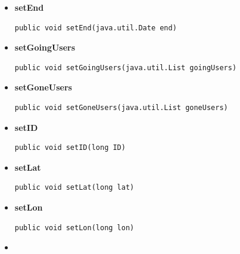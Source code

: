 \documentclass[11pt,a4paper]{article}
\begin{document}
{{{{\begin{itemize}
{\begin{lstlisting}[frame=none]
public void setDescription(java.lang.String description)\end{lstlisting} %
}%
\item{ 
\hypertarget{edu.kit.pse17.go_app.PersistenceLayer.GoEntity.setEnd(java.util.Date)}{{\bf  setEnd}\\}
\begin{lstlisting}[frame=none]
public void setEnd(java.util.Date end)\end{lstlisting} %
}%
\item{ 
\hypertarget{edu.kit.pse17.go_app.PersistenceLayer.GoEntity.setGoingUsers(java.util.List)}{{\bf  setGoingUsers}\\}
\begin{lstlisting}[frame=none]
public void setGoingUsers(java.util.List goingUsers)\end{lstlisting} %
}%
\item{ 
\hypertarget{edu.kit.pse17.go_app.PersistenceLayer.GoEntity.setGoneUsers(java.util.List)}{{\bf  setGoneUsers}\\}
\begin{lstlisting}[frame=none]
public void setGoneUsers(java.util.List goneUsers)\end{lstlisting} %
}%
\item{ 
\hypertarget{edu.kit.pse17.go_app.PersistenceLayer.GoEntity.setID(long)}{{\bf  setID}\\}
\begin{lstlisting}[frame=none]
public void setID(long ID)\end{lstlisting} %
}%
\item{ 
\hypertarget{edu.kit.pse17.go_app.PersistenceLayer.GoEntity.setLat(long)}{{\bf  setLat}\\}
\begin{lstlisting}[frame=none]
public void setLat(long lat)\end{lstlisting} %
}%
\item{ 
\hypertarget{edu.kit.pse17.go_app.PersistenceLayer.GoEntity.setLon(long)}{{\bf  setLon}\\}
\begin{lstlisting}[frame=none]
public void setLon(long lon)\end{lstlisting} %
}%
\item{ 
}
\end{itemize}}}}}
\end{document}
